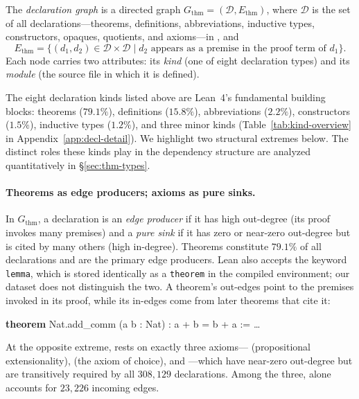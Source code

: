 \begin{definition}
\label{def:thm-graph}
The \emph{declaration graph} is a directed graph $G_{\mathrm{thm}} = (\mathcal{D}, E_{\mathrm{thm}})$, where $\mathcal{D}$ is the set of all declarations---theorems, definitions, abbreviations, inductive types, constructors, opaques, quotients, and axioms---in , and
\[
  E_{\mathrm{thm}} = \{(d_1, d_2) \in \mathcal{D} \times \mathcal{D} \mid d_2 \text{ appears as a premise in the proof term of } d_1\}.
\]
Each node carries two attributes: its \emph{kind} (one of eight declaration types) and its \emph{module} (the source file in which it is defined).
\end{definition}

The eight declaration kinds listed above are Lean~4's fundamental building blocks: theorems ($79.1\%$), definitions ($15.8\%$), abbreviations ($2.2\%$), constructors ($1.5\%$), inductive types ($1.2\%$), and three minor kinds (Table~\ref{tab:kind-overview} in Appendix~\ref{app:decl-detail}). We highlight two structural extremes below. The distinct roles these kinds play in the dependency structure are analyzed quantitatively in \S\ref{sec:thm-types}.

\paragraph{Theorems as edge producers; axioms as pure sinks.}
In $G_{\mathrm{thm}}$, a declaration is an \emph{edge producer} if it has high out-degree (its proof invokes many premises) and a \emph{pure sink} if it has zero or near-zero out-degree but is cited by many others (high in-degree). Theorems constitute $79.1\%$ of all declarations and are the primary edge producers. Lean also accepts the keyword \texttt{lemma}, which is stored identically as a \texttt{theorem} in the compiled environment; our dataset does not distinguish the two. A theorem's out-edges point to the premises invoked in its proof, while its in-edges come from later theorems that cite it:

\begin{codebox}
\textbf{theorem} \textcolor{red!70!black}{Nat.add\_comm} (a b : Nat) : a + b = b + a := \ldots
\end{codebox}

\noindent
At the opposite extreme,  rests on exactly three axioms--- (propositional extensionality),  (the axiom of choice), and ---which have near-zero out-degree but are transitively required by all $308{,}129$ declarations. Among the three,  alone accounts for $23{,}226$ incoming edges.

